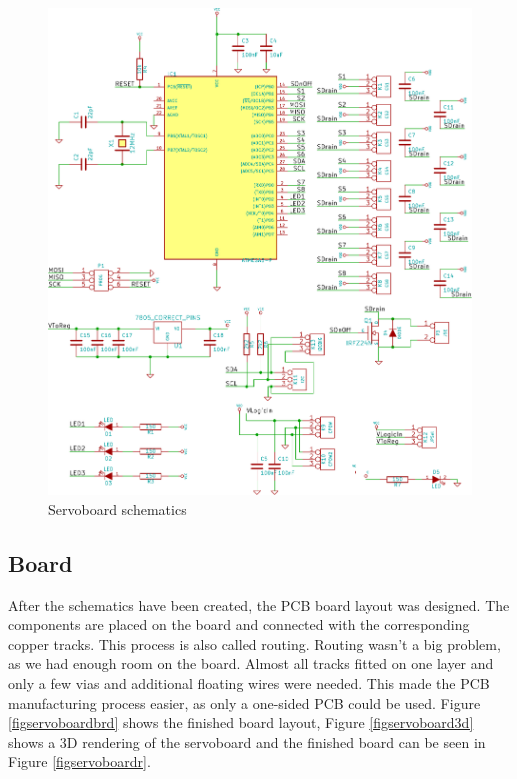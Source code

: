 \documentclass[a4paper
               ,10pt
               ,DIV=10 %
               ,BCOR=0.3cm
               ,pagesize %
               ,headings=small
               ,bibtotoc
               ]
               {scrartcl}
\begin{document}
\begin{figure}[H]
\begin{center}
\includegraphics[width=\linewidth]{pic/servoboard}
\caption{Servoboard schematics}
\end{center}
\label{figservoboardscm}
\end{figure}

\subsection{Board}
After the schematics have been created, the PCB board layout was designed.
The components are placed on the board and connected with the corresponding copper tracks.
This process is also called routing.
Routing wasn't a big problem, as we had enough room on the board.
Almost all tracks fitted on one layer and only a few vias and additional floating wires were needed.
This made the PCB manufacturing process easier, as only a one-sided PCB could be used.
Figure \ref{figservoboardbrd} shows the finished board layout, Figure \ref{figservoboard3d} shows a 3D rendering of the servoboard and the finished board can be seen in Figure \ref{figservoboardr}.
\end{document}
